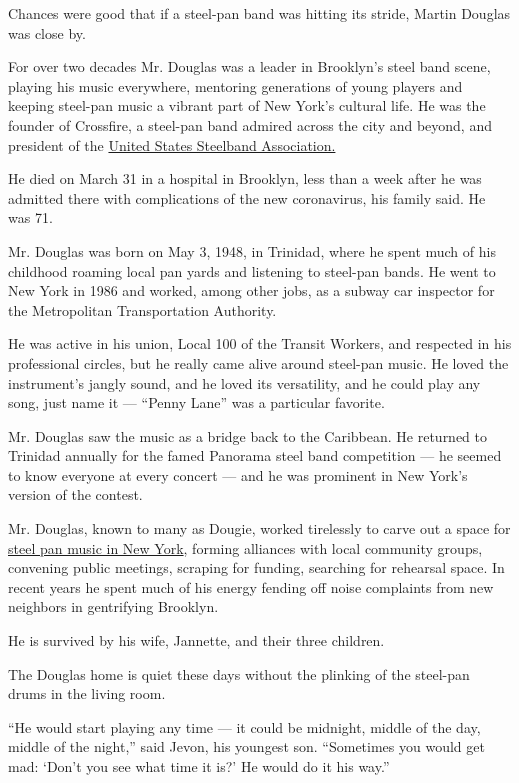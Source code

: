 Chances were good that if a steel-pan band was hitting its stride,
Martin Douglas was close by.

For over two decades Mr. Douglas was a leader in Brooklyn's steel band
scene, playing his music everywhere, mentoring generations of young
players and keeping steel-pan music a vibrant part of New York's
cultural life. He was the founder of Crossfire, a steel-pan band admired
across the city and beyond, and president of the
\href{https://www.panonthenet.com/news/2010/jan/ussa-new-begining-1-17-10.htm}{United
States Steelband Association.}

He died on March 31 in a hospital in Brooklyn, less than a week after he
was admitted there with complications of the new coronavirus, his family
said. He was 71.

Mr. Douglas was born on May 3, 1948, in Trinidad, where he spent much of
his childhood roaming local pan yards and listening to steel-pan bands.
He went to New York in 1986 and worked, among other jobs, as a subway
car inspector for the Metropolitan Transportation Authority.

He was active in his union, Local 100 of the Transit Workers, and
respected in his professional circles, but he really came alive around
steel-pan music. He loved the instrument's jangly sound, and he loved
its versatility, and he could play any song, just name it --- ``Penny
Lane'' was a particular favorite.

Mr. Douglas saw the music as a bridge back to the Caribbean. He returned
to Trinidad annually for the famed Panorama steel band competition ---
he seemed to know everyone at every concert --- and he was prominent in
New York's version of the contest.

Mr. Douglas, known to many as Dougie, worked tirelessly to carve out a
space for
\href{https://www.nytimes3xbfgragh.onion/2015/07/08/arts/music/steel-pan-bands-in-brooklyn-struggle-to-find-rehearsal-space.html}{steel
pan music in New York}, forming alliances with local community groups,
convening public meetings, scraping for funding, searching for rehearsal
space. In recent years he spent much of his energy fending off noise
complaints from new neighbors in gentrifying Brooklyn.

He is survived by his wife, Jannette, and their three children.

The Douglas home is quiet these days without the plinking of the
steel-pan drums in the living room.

``He would start playing any time --- it could be midnight, middle of
the day, middle of the night,'' said Jevon, his youngest son.
``Sometimes you would get mad: `Don't you see what time it is?' He would
do it his way.''

